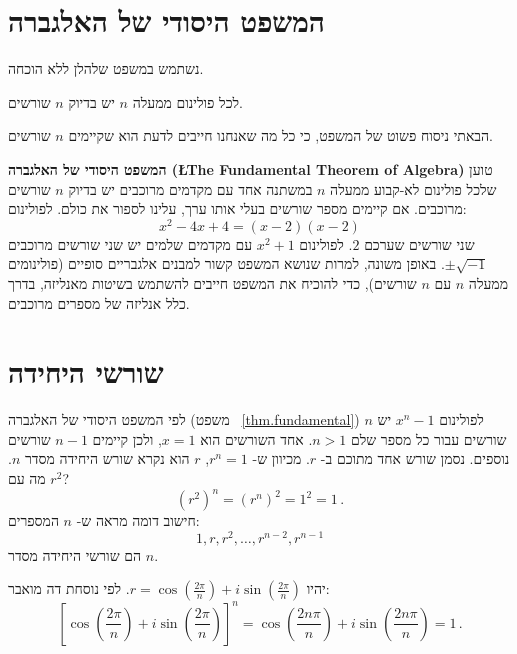 
\newpage

\section{המשפט היסודי של האלגברה}\label{s.fundamental}

נשתמש במשפט שלהלן ללא הוכחה.

\begin{theorem}\label{thm.fundamental}
לכל פולינום ממעלה 
$n$
יש בדיוק 
$n$
שורשים.
\end{theorem}
הבאתי ניסוח פשוט של המשפט, כי כל מה שאנחנו חייבים לדעת הוא שקיימים
$n$
שורשים.

\begin{advanced}
\textbf{המשפט היסודי של האלגברה (\L{The Fundamental Theorem of Algebra})}
טוען שלכל פולינום לא-קבוע ממעלה 
$n$
במשתנה אחד עם מקדמים מרוכבים יש בדיוק 
$n$
שורשים מרוכבים. אם קיימים מספר שורשים בעלי אותו ערך, עלינו לספור את כולם. לפולינום:
\[
x^2-4x+4=(x-2)(x-2)
\]
שני שורשים שערכם
$2$.
לפולינום 
$x^2+1$
עם מקדמים שלמים יש שני שורשים מרוכבים
$\pm\sqrt{-1}$.
באופן משונה, למרות שנושא המשפט קשור למבנים אלגבריים סופיים (פולינומים ממעלה
$n$
עם
$n$
שורשים), כדי להוכיח את המשפט חייבים להשתמש בשיטות מאנליזה, בדרך כלל אנליזה של מספרים מרוכבים.
\end{advanced}


\section{שורשי היחידה}\label{s.roots}

לפי המשפט היסודי של האלגברה (משפט~%
\ref{thm.fundamental})
לפולינום
$x^{n}-1$
יש 
$n$
שורשים עבור כל מספר שלם
$n>	 1$.
אחד השורשים הוא
$x=1$,
ולכן קיימים
$n-1$
שורשים נוספים. נסמן שורש אחד מתוכם ב-%
$r$.
מכיוון ש-%
$r^{n}=1$,
$r$
הוא נקרא שורש היחידה מסדר
$n$.
מה עם
$r^2$?
\[
(r^2)^n=(r^{n})^2=1^2=1\,.
\]
חישוב דומה מראה ש-%
$n$
המספרים:
\[
1, r, r^2, \ldots, r^{n-2}, r^{n-1}
\]
הם שורשי היחידה מסדר
$n$.
\begin{advanced}
יהיו
$r=\cos \left(\frac{2\pi}{n}\right) + i\sin  \left(\frac{2\pi}{n}\right)$.
לפי נוסחת דה מואבר:
\[
\left[\cos \left(\frac{2\pi}{n}\right) + i\sin  \left(\frac{2\pi}{n}\right)\right]^{n}=
\cos \left(\frac{2 n\pi}{n}\right) + i\sin  \left(\frac{2 n\pi}{n}\right)= 1\,.
\]
\vspace{-2ex}
\end{advanced}

